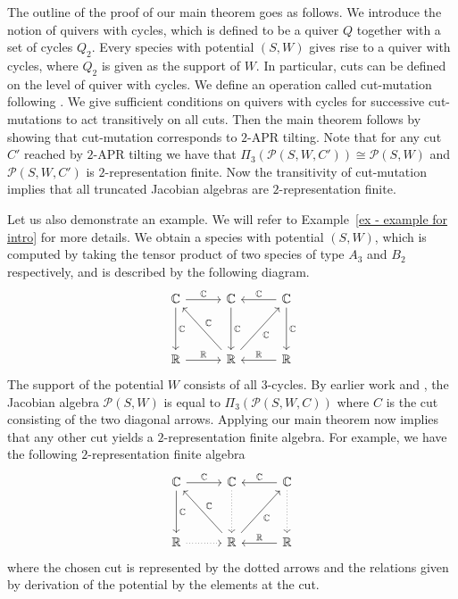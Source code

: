 \documentclass[a4paper, reqno]{amsart}
\theoremstyle{definition}
\newcommand{\C}{\mathbb{C}}
\newcommand{\R}{\mathbb{R}}
\begin{document}
The outline of the proof of our main theorem goes as follows. We introduce the notion of quivers with cycles, which is defined to be a quiver $Q$ together with a set of cycles $Q_2$. Every species with potential $(S, W)$ gives rise to a quiver with cycles, where $Q_2$ is given as the support of $W$. In particular, cuts can be defined on the level of quiver with cycles. We define an operation called cut-mutation following \cite{HerschendOsamu2011quiverwithpotential}. We give sufficient conditions on quivers with cycles for successive cut-mutations to act transitively on all cuts. Then the main theorem follows by showing that cut-mutation corresponds to $2$-APR tilting. Note that for any cut $C'$ reached by $2$-APR tilting we have that $\Pi_3(\mathcal{P}(S, W, C')) \cong \mathcal{P}(S, W)$ and $\mathcal{P}(S, W, C')$ is $2$-representation finite. Now the transitivity of cut-mutation implies that all truncated Jacobian algebras are $2$-representation finite.

Let us also demonstrate an example. We will refer to Example~\ref{ex - example for intro} for more details. We obtain a species with potential $(S, W)$, which is computed by taking the tensor product of two species of type $A_3$ and $B_2$ respectively, and is described by the following diagram.
\begin{equation*}
	\begin{tikzcd}[row sep = 0.6cm, column sep = 1cm]
		\C \arrow[r, "\C"] \arrow[dd, "\C"] & \C \arrow[dd, "\C"] & \C \arrow[l, "\C"'] \arrow[dd, "\C"] \\ \\
		\R \arrow[r, "\R"] & \R \arrow[luu, "\C"'] \arrow[ruu, "\C"'] & \R \arrow[l, "\R"']
	\end{tikzcd}
\end{equation*}
The support of the potential $W$ consists of all $3$-cycles. By earlier work \cite{soderberg2022preprojective} and \cite{soderberg2024mutation}, the Jacobian algebra $\mathcal{P}(S, W)$ is equal to $\Pi_3(\mathcal{P}(S, W, C))$ where $C$ is the cut consisting of the two diagonal arrows. Applying our main theorem now implies that any other cut yields a $2$-representation finite algebra. For example, we have the following $2$-representation finite algebra
\begin{equation*}
	\begin{tikzcd}[row sep = 0.6cm, column sep = 1cm]
		\C \arrow[r, "\C"] \arrow[dd, "\C"] & \C \arrow[dd, dotted] & \C \arrow[l, "\C"'] \arrow[dd, dotted] \\ \\
		\R \arrow[r, dotted] & \R \arrow[luu, "\C"'] \arrow[ruu, "\C"'] & \R \arrow[l, "\R"']
	\end{tikzcd}
\end{equation*}
where the chosen cut is represented by the dotted arrows and the relations given by derivation of the potential by the elements at the cut. \\
\end{document}
